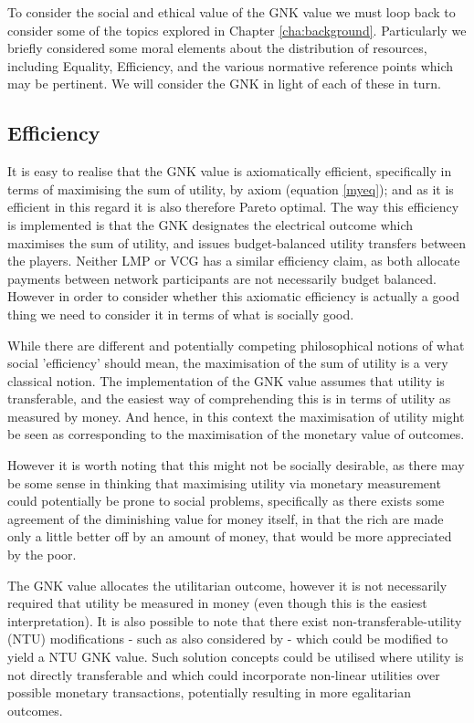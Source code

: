 To consider the social and ethical value of the GNK value we must loop back to consider some of the topics explored in Chapter \ref{cha:background}.
Particularly we briefly considered some moral elements about the distribution of resources, including Equality, Efficiency, and the various normative reference points which may be pertinent.
We will consider the GNK in light of each of these in turn.

\subsection{Efficiency}
It is easy to realise that the GNK value is axiomatically efficient, specifically in terms of maximising the sum of utility, by axiom (equation \ref{myeq}); and as it is efficient in this regard it is also therefore Pareto optimal.
The way this efficiency is implemented is that the GNK designates the electrical outcome which maximises the sum of utility, and issues budget-balanced utility transfers between the players.
Neither LMP or VCG has a similar efficiency claim, as both allocate payments between network participants are not necessarily budget balanced.
However in order to consider whether this axiomatic efficiency is actually a good thing we need to consider it in terms of what is socially good.

While there are different and potentially competing philosophical notions of what social 'efficiency' should mean, the maximisation of the sum of utility is a very classical notion.
The implementation of the GNK value assumes that utility is transferable, and the easiest way of comprehending this is in terms of utility as measured by money. And hence, in this context the maximisation of utility might be seen as corresponding to the maximisation of the monetary value of outcomes.

However it is worth noting that this might not be socially desirable, as there may be some sense in thinking that maximising utility via monetary measurement could potentially be prone to social problems, specifically as there exists some agreement of the diminishing value for money itself, in that the rich are made only a little better off by an amount of money, that would be more appreciated by the poor.

The GNK value allocates the utilitarian outcome, however it is not necessarily required that utility be measured in money (even though this is the easiest interpretation).
It is also possible to note that there exist non-transferable-utility (NTU) modifications - such as also considered by \cite{value1} - which could be modified to yield a NTU GNK value.
Such solution concepts could be utilised where utility is not directly transferable and which could incorporate non-linear utilities over possible monetary transactions, potentially resulting in more egalitarian outcomes.

